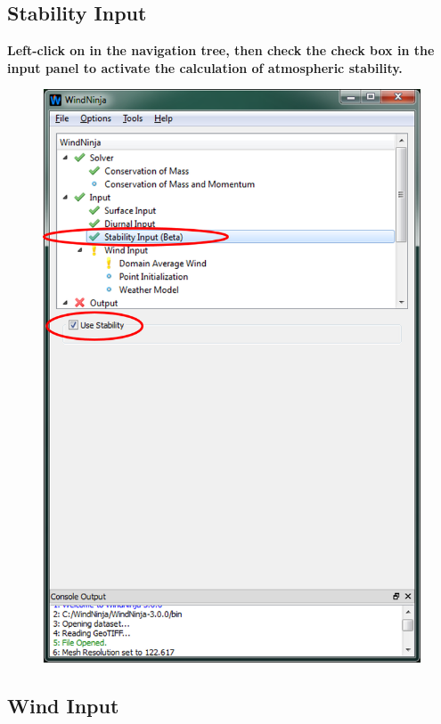 \documentclass[12pt]{article}
\begin{document}
\subsection{Stability Input}

\textbf{\color{red} Left-click on  in the navigation tree, then check the  check box in the input panel to activate the calculation of atmospheric stability.}

\begin{figure}[H]
	\centering
	\label{}
	\includegraphics[scale=1.0]{imgs/stability_layout_1.png}
\end{figure}

\subsection{Wind Input}
\end{document}

